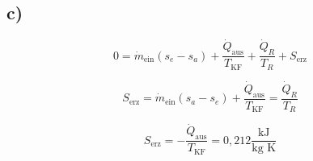 

\subsection*{c)}

\begin{equation*}
0 = \dot{m}_{\text{ein}} (s_e - s_a) + \frac{\dot{Q}_{\text{aus}}}{T_{\text{KF}}} + \frac{\dot{Q}_R}{T_R} + S_{\text{erz}}
\end{equation*}

\begin{equation*}
S_{\text{erz}} = \dot{m}_{\text{ein}} (s_a - s_e) + \frac{\dot{Q}_{\text{aus}}}{T_{\text{KF}}} = \frac{\dot{Q}_R}{T_R}
\end{equation*}

\begin{equation*}
S_{\text{erz}} = - \frac{\dot{Q}_{\text{aus}}}{T_{\text{KF}}} = 0{,}212 \frac{\text{kJ}}{\text{kg K}}
\end{equation*}